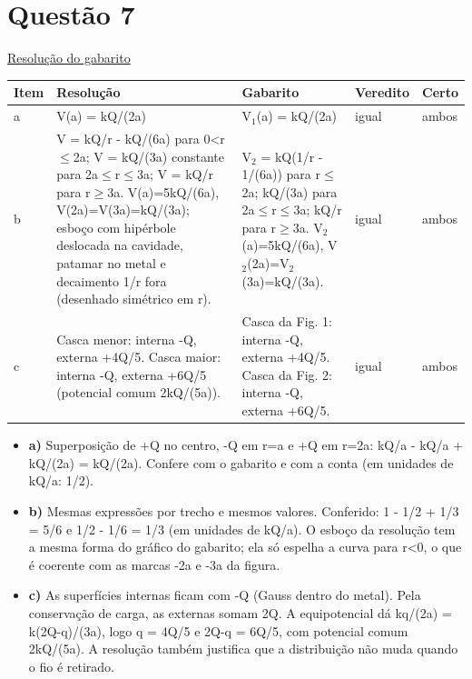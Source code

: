 \documentclass{article}%
\begin{document}
\section*{Questão 7}%
\href{https://poliedroresolve.sistemapoliedro.com.br/vestibulares/ime/2026/ime-2-fase-dia-2-24-10-2025-2-fase-dia-2/dissertativa-7-fisica-2-fase-dia-2-ime-2026}{Resolução do gabarito}\par\smallskip%
\begin{longtable}{@{}p{} p{} p{} p{} p{}@{}}\toprule Item & Resolução & Gabarito & Veredito & Certo \\ \midrule
a & V(a) = kQ/(2a) & V$_{1}$(a) = kQ/(2a) & igual & ambos \\
b & V = kQ/r - kQ/(6a) para 0<r$\leq$2a; V = kQ/(3a) constante para 2a$\leq$r$\leq$3a; V = kQ/r para r$\geq$3a. V(a)=5kQ/(6a), V(2a)=V(3a)=kQ/(3a); esboço com hipérbole deslocada na cavidade, patamar no metal e decaimento 1/r fora (desenhado simétrico em r). & V$_{2}$ = kQ(1/r - 1/(6a)) para r$\leq$2a; kQ/(3a) para 2a$\leq$r$\leq$3a; kQ/r para r$\geq$3a. V$_{2}$(a)=5kQ/(6a), V$_{2}$(2a)=V$_{2}$(3a)=kQ/(3a). & igual & ambos \\
c & Casca menor: interna -Q, externa +4Q/5. Casca maior: interna -Q, externa +6Q/5 (potencial comum 2kQ/(5a)). & Casca da Fig. 1: interna -Q, externa +4Q/5. Casca da Fig. 2: interna -Q, externa +6Q/5. & igual & ambos \\
\bottomrule\end{longtable}%
\begin{itemize}%
\item%
\textbf{a)} Superposição de +Q no centro, -Q em r=a e +Q em r=2a: kQ/a - kQ/a + kQ/(2a) = kQ/(2a). Confere com o gabarito e com a conta (em unidades de kQ/a: 1/2).%
\item%
\textbf{b)} Mesmas expressões por trecho e mesmos valores. Conferido: 1 - 1/2 + 1/3 = 5/6 e 1/2 - 1/6 = 1/3 (em unidades de kQ/a). O esboço da resolução tem a mesma forma do gráfico do gabarito; ela só espelha a curva para r<0, o que é coerente com as marcas -2a e -3a da figura.%
\item%
\textbf{c)} As superfícies internas ficam com -Q (Gauss dentro do metal). Pela conservação de carga, as externas somam 2Q. A equipotencial dá kq/(2a) = k(2Q-q)/(3a), logo q = 4Q/5 e 2Q-q = 6Q/5, com potencial comum 2kQ/(5a). A resolução também justifica que a distribuição não muda quando o fio é retirado.%
\end{itemize}%
\end{document}
